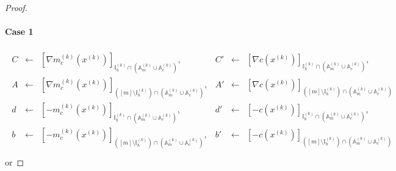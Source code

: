 \documentclass{article}
\theoremstyle{case}
\numberwithin{theorem}{subsection}
\newcommand{\xk}{x^{(k)}}
\newcommand{\activeindicesk}{{ \mathbb I_h^{(k)} }}
\newcommand{\Amk}{{\mathbb A_m^{(k)}}}
\newcommand{\Ack}{{\mathbb A_c^{(k)}}}
\begin{document}
\begin{proof}
\paragraph{Case 1}
\begin{align*}
\begin{array}{cclccl}
C  &\gets& \left[\nabla m^{(k)}_c\left(\xk\right)\right]_{\activeindicesk \cap \left(\Amk \cup \Ack\right)}, &
C' &\gets& \left[\nabla c\left(\xk\right)\right]_{\activeindicesk \cap \left(\Amk \cup \Ack\right)}, \\
A  &\gets& \left[\nabla m^{(k)}_c\left(\xk\right)\right]_{\left([m] \setminus \activeindicesk\right) \cap \left(\Amk \cup \Ack\right)}, &
A' &\gets& \left[\nabla c\left(\xk\right)\right]_{\left([m] \setminus \activeindicesk\right) \cap \left(\Amk \cup \Ack\right)} \\
d  &\gets& \left[-m^{(k)}_c\left(\xk\right)\right]_{\activeindicesk \cap \left(\Amk \cup \Ack\right)}, &
d' &\gets& \left[-c\left(\xk\right)\right]_{\activeindicesk \cap \left(\Amk \cup \Ack\right)}, \\
b  &\gets& \left[-m^{(k)}_c\left(\xk\right)\right]_{\left([m] \setminus \activeindicesk\right) \cap \left(\Amk \cup \Ack\right)}, &
b' &\gets& \left[-c\left(\xk\right)\right]_{\left([m] \setminus \activeindicesk\right) \cap \left(\Amk \cup \Ack\right)} \\
\end{array}
\end{align*}
or

\end{proof}
\end{document}
